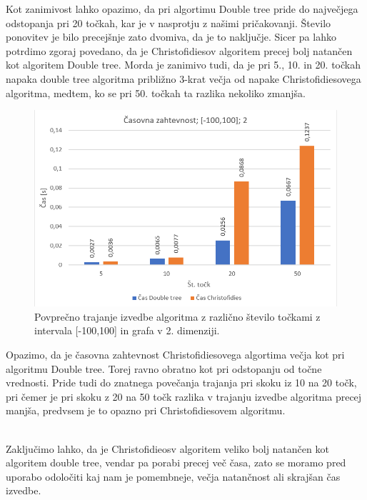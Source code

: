 \documentclass[12pt,a4paper]{amsart}
\theoremstyle{definition} %
\theoremstyle{plain} %
\begin{document}
Kot zanimivost lahko opazimo, da pri algortimu Double tree pride do največjega odstopanja pri 20 točkah, kar je v nasprotju z našimi pričakovanji.
Število ponovitev je bilo precejšnje zato dvomiva, da je to naključje.
Sicer pa lahko potrdimo zgoraj povedano, da je Christofidiesov algoritem precej bolj natančen kot algoritem Double tree.
Morda je zanimivo tudi, da je pri 5., 10. in 20. točkah napaka double tree algoritma približno 3-krat večja od napake Christofidiesovega algoritma, medtem, ko se pri 50. točkah ta razlika nekoliko zmanjša.

\newpage

\begin{figure}[h!]
  \centering
    \includegraphics[width=\linewidth]{CasOverall.PNG}
    \caption{Povprečno trajanje izvedbe algoritma z različno število točkami z intervala [-100,100] in grafa v 2. dimenziji.}
\end{figure}

Opazimo, da je časovna zahtevnost Christofidiesovega algortima večja kot pri algoritmu Double tree. Torej ravno obratno kot pri odstopanju od točne vrednosti.
Pride tudi do znatnega povečanja trajanja pri skoku iz 10 na 20 točk, pri čemer je pri skoku z 20 na 50 točk razlika v trajanju izvedbe algoritma precej manjša, predvsem je to opazno pri Christofidiesovem algoritmu. 
\hfill\\\

Zaključimo lahko, da je Christofidieosv algoritem veliko bolj natančen kot algoritem double tree, vendar pa porabi precej več časa, zato se moramo pred uporabo odoločiti kaj nam je pomembneje, večja natančnost ali skrajšan čas izvedbe.
\end{document}
